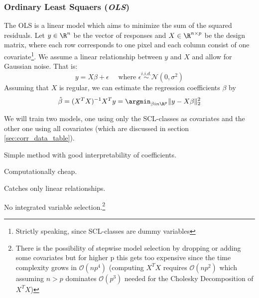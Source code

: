 
\subsubsection*{Ordinary Least Squaers (\textit{OLS})}{
    The OLS is a linear model which aims to minimize the sum of the squared residuals. Let $y\in \R^n$ be the vector of responses and $X\in \R^{n\times p}$ be the design matrix, where each row corresponds to one pixel and each column consist of one covariate\footnote{Strictly speaking, since SCL-classes are dummy variables }. We assume a linear relationship between $y$ and $X$ and allow for Gaussian noise. That is:
    \begin{equation}
        \label{eq:ols}
        y = X\beta  + \epsilon \quad \text{ where }\epsilon \overset{i.i.d.}{\sim}\mathcal{N}(0,\sigma^2)
    \end{equation}
    Assuming that $X$ is regular, we can estimate the regression coefficients $\beta$ by
    \begin{equation}
        \hat \beta = (X^TX)^{-1}X^Ty = \argmin_{\beta in \R^p}\|y - X\beta\|_2^2 
    \end{equation}

    We will train two models, one using only the SCL-classes as covariates and the other one using all covariates (which are discussed in section \ref{sec:corr_data_table}).

    \begin{my_pros_cons_table}{
        \item Simple method with good interpretability of coefficients.
        \item Computationally cheap.
    }{
        \item Catches only linear relationships.
        \item No integrated variable selection.\footnote{There is the possibility of stepwise model selection by dropping or adding some covariates but for higher p this gets too expensive since the time complexity grows in $\mathcal{O}(np^4)$ (computing $X^TX$ requires $\mathcal{O}(np^2)$ which assuming $n>p$ dominates $\mathcal{O}(p^3) $ needed for the Cholesky Decomposition of $X^TX$) %
        }
    }
    \end{my_pros_cons_table}
}

